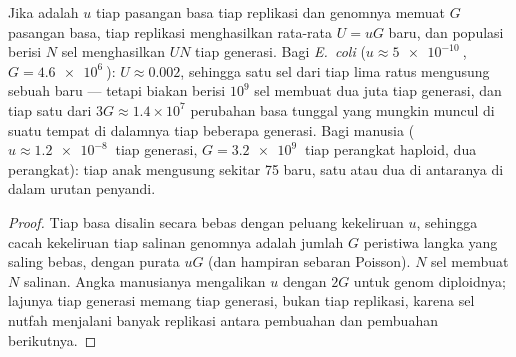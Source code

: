 \begin{theorem}\label{thm:b2:genome-diversification:rate}
Jika  adalah $u$ tiap pasangan basa tiap replikasi dan
genomnya memuat $G$ pasangan basa, tiap replikasi menghasilkan
rata-rata $U = uG$  baru, dan populasi berisi $N$ sel
menghasilkan $UN$  tiap generasi. Bagi \emph{E.~coli}
($u \approx \qty{5e-10}{}$, $G =
\qty{4.6e6}{}$): $U \approx 0.002$, sehingga satu sel dari tiap lima
ratus mengusung sebuah  baru --- tetapi biakan berisi $10^{9}$
sel membuat dua juta  tiap generasi, dan tiap satu dari
$3G \approx 1.4\times
10^{7}$ perubahan basa tunggal yang mungkin muncul di suatu tempat di
dalamnya tiap beberapa generasi. Bagi manusia
($u \approx \qty{1.2e-8}{}$ tiap generasi, $G = \qty{3.2e9}{}$ tiap
perangkat haploid, dua perangkat): tiap anak mengusung sekitar \num{75} 
baru, satu atau dua di antaranya di dalam urutan penyandi.
\end{theorem}
\begin{proof}
Tiap basa disalin secara bebas dengan peluang kekeliruan $u$, sehingga
cacah kekeliruan tiap salinan genomnya adalah jumlah $G$ peristiwa
langka yang saling bebas, dengan purata $uG$ (dan hampiran sebaran
Poisson). $N$ sel membuat $N$ salinan. Angka manusianya mengalikan $u$
dengan $2G$ untuk genom diploidnya; lajunya tiap generasi memang tiap
generasi, bukan tiap replikasi, karena sel nutfah menjalani banyak
replikasi antara pembuahan dan pembuahan berikutnya.
\end{proof}

